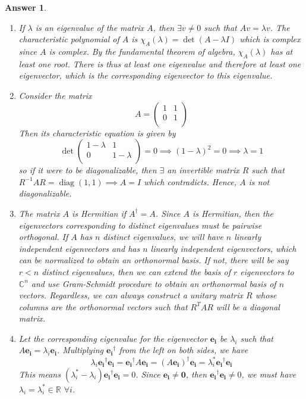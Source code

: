 \documentclass[a4paper]{article}
\DeclareMathOperator{\diag}{diag}
\newtheorem{ans}{Answer}[section]
\theoremstyle{new}
\begin{document}
\begin{ans}\leavevmode
\begin{enumerate}[label=(\alph*)]
\item If $\lambda$ is an eigenvalue of the matrix $A$, then $\exists v\neq 0$ such that $Av=\lambda v$. The characteristic polynomial of $A$ is $\chi_A(\lambda)=\det(A-\lambda I)$ which is complex since $A$ is complex. By the fundamental theorem of algebra, $\chi_A(\lambda)$ has at least one root. There is thus at least one eigenvalue and therefore at least one eigenvector, which is the corresponding eigenvector to this eigenvalue.
\item Consider the matrix
$$A=\begin{pmatrix}1&1\\0&1\\\end{pmatrix}$$
Then its characteristic equation is given by
$$\det\begin{pmatrix}1-\lambda&1\\0&1-\lambda\\\end{pmatrix}=0\implies(1-\lambda)^2=0\implies\lambda=1$$
so if it were to be diagonalizable, then $\exists$ an invertible matrix $R$ such that $R^{-1}AR=\diag(1,1)\implies A=I$ which contradicts. Hence, $A$ is not diagonalizable.
\item The matrix $A$ is Hermitian if $A^\dag=A$. Since $A$ is Hermitian, then the eigenvectors corresponding to distinct eigenvalues must be pairwise orthogonal. If $A$ has $n$ distinct eigenvalues, we will have $n$ linearly independent eigenvectors and has $n$ linearly independent eigenvectors, which can be normalized to obtain an orthonormal basis. If not, there will be say $r<n$ distinct eigenvalues, then we can extend the basis of $r$ eigenvectors to $\mathbb{C}^n$ and use Gram-Schmidt procedure to obtain an orthonormal basis of $n$ vectors. Regardless, we can always construct a unitary matrix $R$ whose columns are the orthonormal vectors such that $R^TAR$ will be a diagonal matrix.
\item Let the corresponding eigenvalue for the eigenvector $\mathbf{e_i}$ be $\lambda_i$ such that $A\mathbf{e_i}=\lambda_i\mathbf{e_i}$. Multiplying $\mathbf{e_i}^\dag$ from the left on both sides, we have
$$\lambda_i\mathbf{e_i}^\dag\mathbf{e_i}=\mathbf{e_i}^\dag A\mathbf{e_i}=(A\mathbf{e_i})^\dag\mathbf{e_i}=\lambda_i^*\mathbf{e_i}^\dag\mathbf{e_i}$$
This means $(\lambda_i^*-\lambda_i)\mathbf{e_i}^\dag\mathbf{e_i}=0$. Since $\mathbf{e_i}\neq\boldsymbol{0}$, then $\mathbf{e_i}^\dag\mathbf{e_i}\neq0$, we must have $\lambda_i=\lambda_i^*\in\mathbb{R}$ $\forall i$.

\end{enumerate}
\end{ans}
\end{document}
